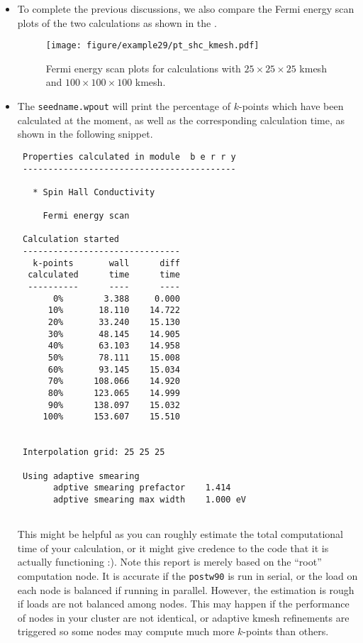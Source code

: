 \begin{itemize}
\item To complete the previous discussions, we also 
compare the Fermi energy scan plots of the two calculations as 
shown in the . 
\begin{figure}[!htb]
\centering
\texttt{[image: figure/example29/pt\_shc\_kmesh.pdf]}
\caption{Fermi energy scan plots for calculations 
	with $25\times25\times25$ kmesh and $100\times100\times100$ kmesh.}
\label{fig29.3}
\end{figure}

\item The {\tt seedname.wpout} will print the percentage of $k$-points which 
have been calculated at the moment, as well as the corresponding calculation time, as 
shown in the following snippet. 

\begin{tcolorbox}[title=Pt.wpout,sharp corners,boxrule=0.5pt]
{\small
\begin{verbatim}
 Properties calculated in module  b e r r y
 ------------------------------------------

   * Spin Hall Conductivity

     Fermi energy scan
 
 Calculation started
 -------------------------------
   k-points       wall      diff
  calculated      time      time
  ----------      ----      ----
       0%        3.388     0.000
      10%       18.110    14.722
      20%       33.240    15.130
      30%       48.145    14.905
      40%       63.103    14.958
      50%       78.111    15.008
      60%       93.145    15.034
      70%      108.066    14.920
      80%      123.065    14.999
      90%      138.097    15.032
     100%      153.607    15.510


 Interpolation grid: 25 25 25

 Using adaptive smearing
       adptive smearing prefactor    1.414
       adptive smearing max width    1.000 eV
       
\end{verbatim}
}
\end{tcolorbox}
This might be helpful as you can roughly 
estimate the total computational time 
of your calculation, or it might give credence to the code that it is actually functioning :). 
Note this report is merely based on the ``root'' computation node. It is accurate if the {\tt postw90} is run in serial, or the load on each node is balanced if running in parallel. However, the estimation is rough if loads are not balanced among nodes. This may happen if the performance of nodes in your cluster are not identical, or adaptive kmesh refinements are triggered so some nodes may compute much more $k$-points than others. 
\end{itemize}

